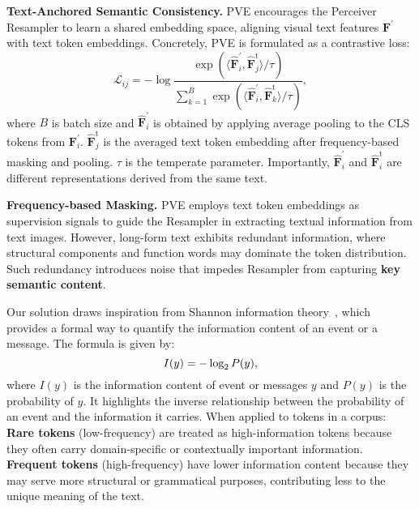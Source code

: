 \noindent\textbf{Text-Anchored Semantic Consistency.}
PVE encourages the Perceiver Resampler to learn a shared embedding space, aligning visual text features $\bm{F}^{'}$ with text token embeddings. Concretely, 
PVE is formulated as a contrastive loss:
\begin{equation}
\label{eq:FCL}
    \mathcal{L}_{ij} = -\log \frac {\exp(\langle \hat{\bm{F}}^{'}_{i}, \hat{\bm{F}}^\text{t}_j \rangle / \tau)} 
    {\sum_{k=1}^B \exp (\langle \hat{\bm{F}}^{'}_{i}, \hat{\bm{F}}^\text{t}_k \rangle /\tau )},  
\end{equation}
where $B$ is batch size and $\hat{\bm{F}}^{'}_{i}$ is obtained by applying average pooling to the CLS tokens from $\bm{F}^{'}_{i}$.
$\hat{\bm{F}}^\text{t}_j$ is the averaged text token embedding after frequency-based masking and pooling.
$\tau$ is the temperate parameter. 
Importantly, $\hat{\bm{F}}^{'}_{i}$ and $\hat{\bm{F}}^\text{t}_i$ are different representations derived from the same text.


\noindent\textbf{Frequency-based Masking.} 
PVE employs text token embeddings as supervision signals to guide the Resampler in extracting textual information from text images. 
However, long-form text exhibits redundant information, where structural components and function words may dominate the token distribution.
Such redundancy introduces noise that impedes Resampler from capturing \textbf{key semantic content}.



Our solution draws inspiration from Shannon information theory~\cite{shannon1948mathematical}, which provides a formal way to quantify the information content of an event or a message. 
The formula is given by:
\vspace{-2pt}
\begin{equation}
I(y) = -\log_{2} P(y),
\vspace{-2pt}
\end{equation} where $I(y)$ is the information content of event or messages $y$ and $P(y)$ is the probability of $y$. 
It highlights the inverse relationship between the probability of an event and the information it carries. 
When applied to tokens in a corpus: \textbf{Rare tokens} (low-frequency) are treated as high-information tokens because they often carry domain-specific or contextually important information. 
\textbf{Frequent tokens} (high-frequency) have lower information content because they may serve more structural or grammatical purposes, contributing less to the unique meaning of the text. 

